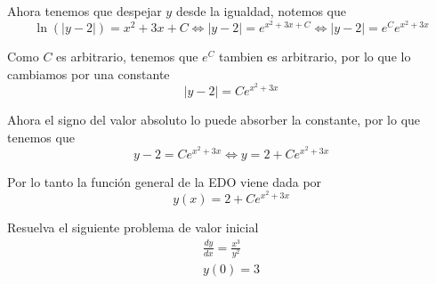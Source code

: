 \documentclass[a4paper,oneside,10.5pt]{article}
\begin{document}
\begin{sol}
  Ahora tenemos que despejar $y$ desde la igualdad, notemos que
  \begin{equation*}
    \ln(|y - 2|) = x^{2} + 3x + C \iff |y - 2| = e^{x^{2} + 3x + C} \iff |y - 2| = e^{C}e^{x^{2} + 3x}
  \end{equation*}

  Como $C$ es arbitrario, tenemos que $e^{C}$ tambien es arbitrario, por lo que lo cambiamos por una constante
  \begin{equation*}
    |y - 2| = Ce^{x^{2} + 3x}
  \end{equation*}

  Ahora el signo del valor absoluto lo puede absorber la constante, por lo que tenemos que
  \begin{equation*}
    y - 2 = Ce^{x^{2} + 3x} \iff y = 2 + Ce^{x^{2} + 3x}
  \end{equation*}

  Por lo tanto la funci\'on general de la EDO viene dada por
  \begin{equation*}
    y(x) = 2 + Ce^{x^{2} + 3x}
  \end{equation*}
\end{sol}

\begin{prob}
  Resuelva el siguiente problema de valor inicial
  \begin{gather*}
    \frac{dy}{dx} = \frac{x^{3}}{y^{2}}\\
    y(0) = 3
  \end{gather*}
\end{prob}
\end{document}
